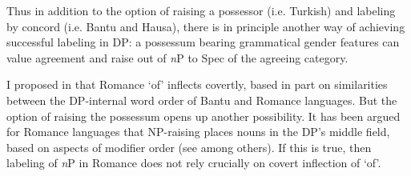 \documentclass[output=paper
,modfonts
,nonflat]{langsci/langscibook}
\begin{document}
\begin{figure}
	\begin{exe}
	\end{exe}
\end{figure} 

\noindent Thus in addition to the option of raising a possessor (i.e. Turkish) and labeling by concord (i.e. Bantu and Hausa), there is in principle another way of achieving successful labeling in DP: a possessum bearing grammatical gender features can value agreement and raise out of \textit{n}P to Spec of the agreeing category.

I proposed in  that Romance ‘of’ inflects covertly, based in part on similarities between the DP-internal word order of Bantu and Romance languages. But the option of raising the possessum opens up another possibility. It has been argued for Romance languages that NP-raising places nouns in the DP’s middle field, based on aspects of modifier order (see \citealt{Laenzlinger2005} among others). If this is true, then labeling of \textit{n}P in Romance does not rely crucially on covert inflection of ‘of’. 
\end{document}
